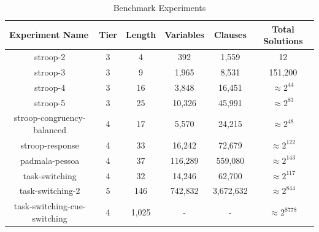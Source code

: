 \begin{table}[htb]
  \centering
  \caption{Benchmark Experiments}
\begin{tabular}{|c|c|c|c|c|c|}
\hline
\multicolumn{1}{|l|}{Experiment Name} & Tier  & Length          & Variables  & Clauses    & Total Solutions    \\ \hline
stroop-2                              & 3     & 4               & 392        & 1,559      & 12                 \\ \hline
stroop-3                              & 3     & 9               & 1,965      & 8,531      & 151,200            \\ \hline
stroop-4                              & 3     & 16              & 3,848      & 16,451     & $\approx 2^{44}$   \\ \hline
stroop-5                              & 3     & 25              & 10,326     & 45,991     & $\approx 2^{83}$   \\ \hline
stroop-congruency-balanced            & 4     & 17              & 5,570      & 24,215     & $\approx 2^{48}$   \\ \hline
stroop-response                       & 4     & 33              & 16,242     & 72,679     & $\approx 2^{122}$  \\ \hline
padmala-pessoa                        & 4     & 37              & 116,289    & 559,080    & $\approx 2^{143}$  \\ \hline
task-switching                        & 4     & 32              & 14,246     & 62,700     & $\approx 2^{117}$  \\ \hline
task-switching-2                      & 5     & 146             & 742,832    & 3,672,632  & $\approx 2^{844}$  \\ \hline
task-switching-cue-switching          & 4     & 1,025           & -          & -          & $\approx 2^{8778}$ \\ \hline
\end{tabular}
\label{tab:benchmark_experiments}%
\end{table}



